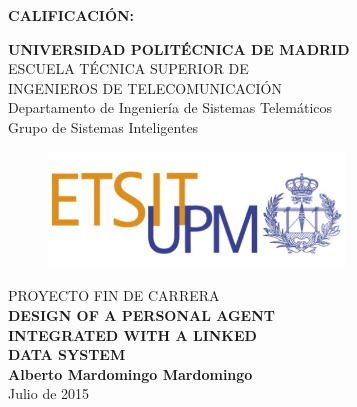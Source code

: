 {\large{\bf CALIFICACIÓN:}}
\pagestyle{empty}
\cleardoublepage
\vspace*{\baselineskip}
\begin{center}
	{\LARGE\rm\textbf{UNIVERSIDAD POLITÉCNICA DE MADRID}\\
	\vspace{1.0cm}
	 ESCUELA TÉCNICA SUPERIOR DE\\ INGENIEROS DE TELECOMUNICACIÓN
	  }  \\

	 {\Large\rm Departamento de Ingeniería de Sistemas Telemáticos\\
	 Grupo de Sistemas Inteligentes  }  \\

\begin{figure}[!htbp]
	\centering
    \includegraphics[width=0.7\textwidth]{img/logos/logo_etsit.jpg}

\end{figure}
	\vspace{1.0cm}
	{{\LARGE\rm PROYECTO FIN DE CARRERA\\
	\vspace{2.0cm}
	 \textbf{DESIGN OF A PERSONAL AGENT}\\	 
	 \textbf{INTEGRATED WITH A LINKED}\\ 
	 \vspace{0.5cm}
	 \textbf{DATA SYSTEM} }}  \\
	 
	 \vspace{1.0cm}
     \Large\rm\textbf{Alberto Mardomingo Mardomingo}\\
	 \vspace{1.0cm}
	 Julio de 2015
\end{center}  
